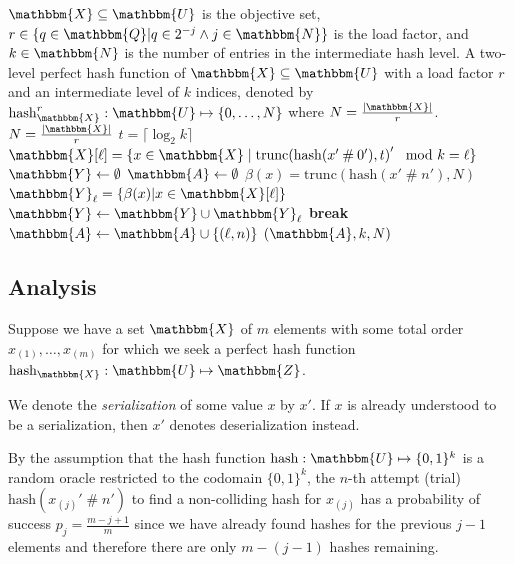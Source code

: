 \documentclass[hidelinks,11pt,final]{article}
\theoremstyle{plain}
\newcommand{\cat}{\mathbin{\#}}
\newcommand{\Break}{\textbf{break}}
\begin{document}
\begin{algorithm}
	\caption{Two-level perfect hash function constructor}
	\label{alg:2ph}
	\KwIn
	{
		$\mathbbm{X} \subseteq \mathbbm{U}$ is the objective set, $r \in \{q \in \mathbbm{Q} | q \in 2^{-j} \land j \in \mathbbm{N}\}$ is the load factor, and $k \in \mathbbm{N}$ is the number of entries in the intermediate hash level.
	}
	\KwOut
	{
		A two-level perfect hash function of $\mathbbm{X} \subseteq \mathbbm{U}$ with a load factor $r$ and an intermediate level of $k$ indices, denoted by $\mathrm{hash}_{\mathbbm{X}}^{r} : \mathbbm{U} \mapsto \left\{0,\ldots,N\right\}$ where $N = \frac{|\mathbbm{X}|}{r}$.
	}
	{
		$N = \frac{|\mathbbm{X}|}{r}$\;
		$t = \lceil \log_2 k \rceil$\;
		$\mathbbm{X}[\ell] = \{x \in \mathbbm{X} \mid \mathrm{trunc}\!\left(\mathrm{hash}(x' \cat 0'),t\right)' \mod k = \ell\}$\;
		$\mathbbm{Y} \gets \emptyset$\;
		$\mathbbm{A} \gets \emptyset$\;		
		{
			{
				$\beta(x) = \mathrm{trunc}\!\left(\mathrm{hash}(x' \cat n'),N\right)$\;
				$\mathbbm{Y}_\ell = \{\beta(x) | x \in \mathbbm{X}[\ell]\}$\;
				{
					$\mathbbm{Y} \gets \mathbbm{Y} \cup \mathbbm{Y}_\ell$\;
					\Break\;
				}
			}
			$\mathbbm{A} \gets \mathbbm{A} \cup \{(\ell,n)\}$\;
		}
		\Return $(\mathbbm{A},k,N)$
	}
\end{algorithm}

\subsection{Analysis}
Suppose we have a set $\mathbbm{X}$ of $m$ elements with some total order $x_{(1)},\ldots,x_{(m)}$ for which we seek a perfect hash function $\mathrm{hash}_{\mathbbm{X}} : \mathbbm{U} \mapsto \mathbbm{Z}$.

We denote the \emph{serialization} of some value $x$ by $x'$.
If $x$ is already understood to be a serialization, then $x'$ denotes deserialization instead.

By the assumption that the hash function $\mathrm{hash} : \mathbbm{U} \mapsto \{0,1\}^k$ is a random oracle restricted to the codomain $\{0,1\}^k$, the $n$-th attempt (trial) $\mathrm{hash}\!\left(x_{(j)}' \cat n'\right)$ to find a non-colliding hash for $x_{(j)}$ has a probability of success $p_j = \frac{m-j+1}{m}$ since we have already found hashes for the previous $j-1$ elements and therefore there are only $m-(j-1)$ hashes remaining.
\end{document}
